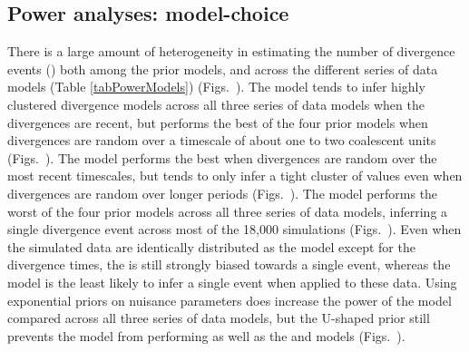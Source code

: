 \documentclass[letterpaper,12pt]{article}
\begin{document}
\begin{linenumbers}
\subsection*{Power analyses: model-choice}
There is a large amount of heterogeneity in estimating the number of divergence
events (\divTimeNum) both among the prior models, and across the different
series of data models (Table \ref{tabPowerModels}) (Figs.\
).
The \modelDPP model tends to infer highly clustered divergence models across
all three series of data models when the divergences are recent, but performs
the best of the four prior models  when divergences are random over a timescale
of about one to two coalescent units (Figs.\
).
The \modelUniform model performs the best when divergences are random
over the most recent timescales, but tends to only infer a tight
cluster of \divTimeNum values even when divergences are random
over longer periods (Figs.\
).
The \modelOld model performs the worst of the four prior models across
all three series of data models, inferring a single divergence event across
most of the 18,000 simulations (Figs.\
).
Even when the simulated data are identically distributed as the \modelOld model
except for the divergence times, the \modelOld is still strongly biased towards
a single event, whereas the \modelDPP model is the least likely to infer a
single event when applied to these data.
Using exponential priors on nuisance parameters does increase the power
of the \modelUshaped model compared \modelOld across all three series
of data models, but the U-shaped prior still prevents the model
from performing as well as the \modelDPP and \modelUniform models (Figs.\
).


\end{linenumbers}
\end{document}
